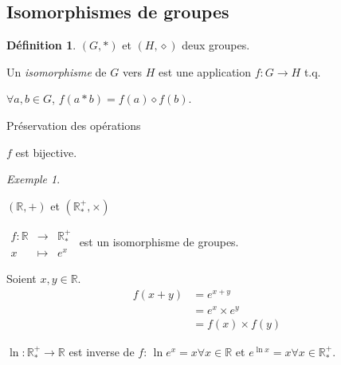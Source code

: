 \documentclass{report}
\newcommand*{\reels}{\mathbb{R}}
\theoremstyle{definition}
\newtheorem*{defin}{D\'efinition}
\theoremstyle{remark}
\newtheorem*{exem}{Exemple}
\begin{document}
	\subsection{Isomorphismes de groupes}
	\begin{defin}
		$(G,*)$ et $(H,\diamond)$ deux groupes.

		Un \emph{isomorphisme} de $G$ vers $H$ est une application $f:G \to H$ t.q.
		\begin{nlist}[noitemsep]
			\item $\forall a,b \in G$, $f(a*b)=f(a)\diamond f(b)$.

			Pr\'eservation des op\'erations
			\item $f$ est bijective.
		\end{nlist}
	\end{defin}
	\begin{exem}~

		\begin{ulist}
			\item $(\reels,+)$ et $(\reels^+_*,\times)$

			$\begin{array}{rcl}
				f:\reels&\to&\reels^+_*\\
				x&\mapsto&e^x
			\end{array}$ est un isomorphisme de groupes.
			\begin{nlist}
				\item Soient $x,y \in \reels$.
				\begin{align*}
					f(x+y)&= e^{x+y}\\
					&= e^x \times e^y\\
					&= f(x) \times f(y)
				\end{align*}
				\item $\ln:\reels^+_* \to \reels$ est inverse de $f$: $\ln e^x=x \forall x \in \reels$ et $e^{\ln x}=x \forall x \in \reels^+_*$.
			\end{nlist}
		\end{ulist}
	\end{exem}
\end{document}
